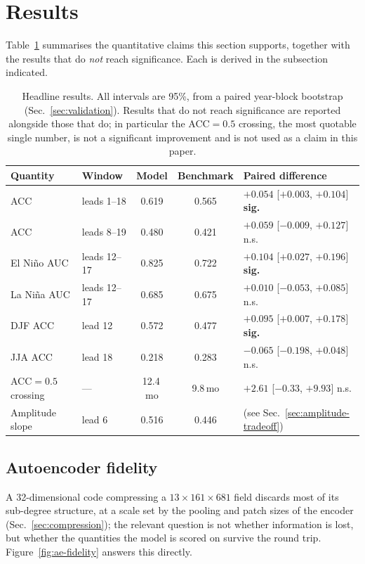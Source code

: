 \section{Results}
\label{sec:results}

Table~\ref{tab:headline} summarises the quantitative claims this section supports, together
with the results that do \emph{not} reach significance. Each is derived in the subsection
indicated.

\begin{table}[t]
\centering
\small
\begin{tabular}{@{}llccl@{}}
\toprule
Quantity & Window & Model & Benchmark & Paired difference \\
\midrule
ACC & leads 1--18 & 0.619 & 0.565 & $+0.054$ [$+0.003$, $+0.104$] \textbf{sig.} \\
ACC & leads 8--19 & 0.480 & 0.421 & $+0.059$ [$-0.009$, $+0.127$] n.s. \\
El Ni\~no AUC & leads 12--17 & 0.825 & 0.722 & $+0.104$ [$+0.027$, $+0.196$] \textbf{sig.} \\
La Ni\~na AUC & leads 12--17 & 0.685 & 0.675 & $+0.010$ [$-0.053$, $+0.085$] n.s. \\
DJF ACC & lead 12 & 0.572 & 0.477 & $+0.095$ [$+0.007$, $+0.178$] \textbf{sig.} \\
JJA ACC & lead 18 & 0.218 & 0.283 & $-0.065$ [$-0.198$, $+0.048$] n.s. \\
ACC$=0.5$ crossing & --- & 12.4\,mo & 9.8\,mo & $+2.61$ [$-0.33$, $+9.93$] n.s. \\
Amplitude slope & lead 6 & 0.516 & 0.446 & (see Sec.~\ref{sec:amplitude-tradeoff}) \\
\bottomrule
\end{tabular}
\caption{Headline results. All intervals are 95\%, from a paired year-block bootstrap
(Sec.~\ref{sec:validation}). Results that do not reach significance are reported alongside
those that do; in particular the ACC$=0.5$ crossing, the most quotable single number, is not a
significant improvement and is not used as a claim in this paper.}
\label{tab:headline}
\end{table}

\subsection{Autoencoder fidelity}
\label{sec:ae-fidelity}

A 32-dimensional code compressing a $13\times161\times681$ field discards most of its
sub-degree structure, at a scale set by the pooling and patch sizes of the encoder
(Sec.~\ref{sec:compression}); the relevant question is not whether information is lost, but
whether the quantities the model is scored on survive the round trip.
Figure~\ref{fig:ae-fidelity} answers this directly.

